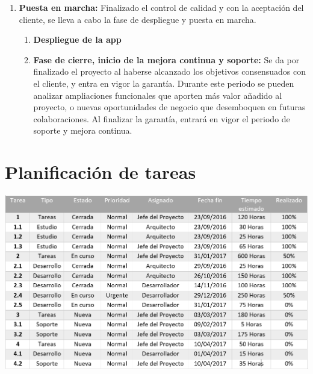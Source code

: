 \documentclass[a4paper,10pt]{scrartcl}
\begin{document}
\begin{enumerate}
	\item \textbf{Puesta en marcha:} Finalizado el control de calidad y con la aceptación del cliente, se lleva a cabo la fase de despliegue y puesta en marcha.
	\begin{enumerate}[label*=\arabic*.]
		\item \textbf{Despliegue de la app}
		\item \textbf{Fase de cierre, inicio de la mejora continua y soporte:} Se da por finalizado el proyecto al haberse alcanzado los objetivos consensuados con el cliente, y entra en vigor la garantía. Durante este periodo se pueden analizar ampliaciones funcionales que aporten más valor añadido al proyecto, o nuevas oportunidades de negocio que desemboquen en futuras colaboraciones. Al finalizar la garantía, entrará en vigor el periodo de soporte y mejora continua.
	\end{enumerate}
\end{enumerate}

\newpage

\section{Planificación de tareas}

\begin{center}
	\includegraphics[width=16cm]{tabla}
\end{center}




\end{document}
